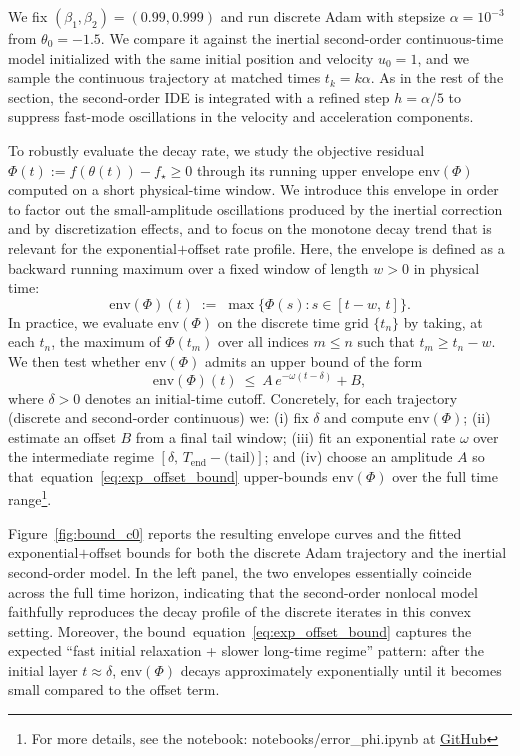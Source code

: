 \documentclass{article} %
\def\eqref#1{equation~\ref{#1}}
\begin{document}
We fix $(\beta_1,\beta_2)=(0.99,0.999)$ and run discrete Adam with stepsize $\alpha=10^{-3}$ from $\theta_0=-1.5$. We compare it against the inertial second-order continuous-time model initialized with the same initial position and velocity $u_0=1$, and we sample the continuous trajectory at matched times $t_k=k\alpha$. As in the rest of the section, the second-order IDE is integrated with a refined step $h=\alpha/5$ to suppress fast-mode oscillations in the velocity and acceleration components.

To robustly evaluate the decay rate, we study the objective residual $\Phi(t):=f(\theta(t))-f_\star\ge 0$ through its running upper envelope $\mathrm{env}(\Phi)$ computed on a short physical-time window. We introduce this envelope in order to factor out the small-amplitude oscillations produced by the inertial correction and by discretization effects, and to focus on the monotone decay trend that is relevant for the exponential$+$offset rate profile. Here, the envelope is defined as a backward running maximum over a fixed window of length $w>0$ in physical time:
\[
\mathrm{env}(\Phi)(t)\;:=\;\max\bigl\{\Phi(s): s\in[t-w,\,t]\bigr\}.
\]
In practice, we evaluate $\mathrm{env}(\Phi)$ on the discrete time grid $\{t_n\}$ by taking, at each $t_n$, the maximum of $\Phi(t_m)$ over all indices $m\le n$ such that $t_m\ge t_n-w$. We then test whether $\mathrm{env}(\Phi)$ admits an upper bound of the form
\begin{equation}\label{eq:exp_offset_bound}
\mathrm{env}(\Phi)(t)\ \le\ A\,e^{-\omega (t-\delta)} + B,
\end{equation}
where $\delta>0$ denotes an initial-time cutoff. Concretely, for each trajectory (discrete and second-order continuous) we: (i) fix $\delta$ and compute $\mathrm{env}(\Phi)$; (ii) estimate an offset $B$ from a final tail window; (iii) fit an exponential rate $\omega$ over the intermediate regime $[\delta,\,T_{\mathrm{end}}-\text{(tail)}]$; and (iv) choose an amplitude $A$ so that~\eqref{eq:exp_offset_bound} upper-bounds $\mathrm{env}(\Phi)$ over the full time range\footnote{For more details, see the notebook: notebooks/error\_phi.ipynb at \href{https://github.com/carlosherediapimienta/nonlocal-adam}{GitHub}}.

Figure~\ref{fig:bound_c0} reports the resulting envelope curves and the fitted exponential$+$offset bounds for both the discrete Adam trajectory and the inertial second-order model. In the left panel, the two envelopes essentially coincide across the full time horizon, indicating that the second-order nonlocal model faithfully reproduces the decay profile of the discrete iterates in this convex setting. Moreover, the bound~\eqref{eq:exp_offset_bound} captures the expected ``fast initial relaxation + slower long-time regime'' pattern: after the initial layer $t\approx\delta$, $\mathrm{env}(\Phi)$ decays approximately exponentially until it becomes small compared to the offset term.
\end{document}

